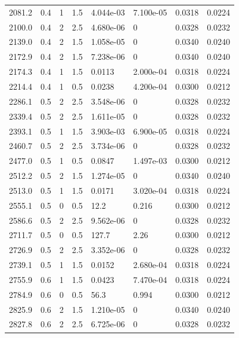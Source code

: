 \documentclass[preview]{standalone}
\begin{document}
{{{\begin{tabular}{L{1.2cm}C{1.2cm} C{0.3cm}C{0.5cm} C{1.4cm}C{1.4cm} C{1.4cm}C{1.4cm}}
  2081.2  &   0.4  & 1     & 1.5 &  4.044e-03  & 7.100e-05  & 0.0318 &  0.0224   \\ 
  2100.0  &   0.4  & 2     & 2.5 &  4.680e-06  & 0  & 0.0328 &  0.0232   \\ 
  2139.0  &   0.4  & 2     & 1.5 &  1.058e-05  & 0  & 0.0340 &  0.0240   \\ 
  2172.9  &   0.4  & 2     & 1.5 &  7.238e-06  & 0  & 0.0340 &  0.0240   \\ 
  2174.3  &   0.4  & 1     & 1.5 &  0.0113  & 2.000e-04  & 0.0318 &  0.0224   \\ 
  2214.4  &   0.4  & 1     & 0.5 &  0.0238  & 4.200e-04  & 0.0300 &  0.0212   \\ 
  2286.1  &   0.5  & 2     & 2.5 &  3.548e-06  & 0  & 0.0328 &  0.0232   \\ 
  2339.4  &   0.5  & 2     & 2.5 &  1.611e-05  & 0  & 0.0328 &  0.0232   \\ 
  2393.1  &   0.5  & 1     & 1.5 &  3.903e-03  & 6.900e-05  & 0.0318 &  0.0224   \\ 
  2460.7  &   0.5  & 2     & 2.5 &  3.734e-06  & 0  & 0.0328 &  0.0232   \\ 
  2477.0  &   0.5  & 1     & 0.5 &  0.0847  & 1.497e-03  & 0.0300 &  0.0212   \\ 
  2512.2  &   0.5  & 2     & 1.5 &  1.274e-05  & 0  & 0.0340 &  0.0240   \\ 
  2513.0  &   0.5  & 1     & 1.5 &  0.0171  & 3.020e-04  & 0.0318 &  0.0224   \\ 
  2555.1  &   0.5  & 0     & 0.5 &  12.2  & 0.216  & 0.0300 &  0.0212   \\ 
  2586.6  &   0.5  & 2     & 2.5 &  9.562e-06  & 0  & 0.0328 &  0.0232   \\ 
  2711.7  &   0.5  & 0     & 0.5 &  127.7  & 2.26  & 0.0300 &  0.0212   \\ 
  2726.9  &   0.5  & 2     & 2.5 &  3.352e-06  & 0  & 0.0328 &  0.0232   \\ 
  2739.1  &   0.5  & 1     & 1.5 &  0.0152  & 2.680e-04  & 0.0318 &  0.0224   \\ 
  2755.9  &   0.6  & 1     & 1.5 &  0.0423  & 7.470e-04  & 0.0318 &  0.0224   \\ 
  2784.9  &   0.6  & 0     & 0.5 &  56.3  & 0.994  & 0.0300 &  0.0212   \\ 
  2825.9  &   0.6  & 2     & 1.5 &  1.210e-05  & 0  & 0.0340 &  0.0240   \\ 
  2827.8  &   0.6  & 2     & 2.5 &  6.725e-06  & 0  & 0.0328 &  0.0232   \\ 

\end{tabular}}}}
\end{document}
